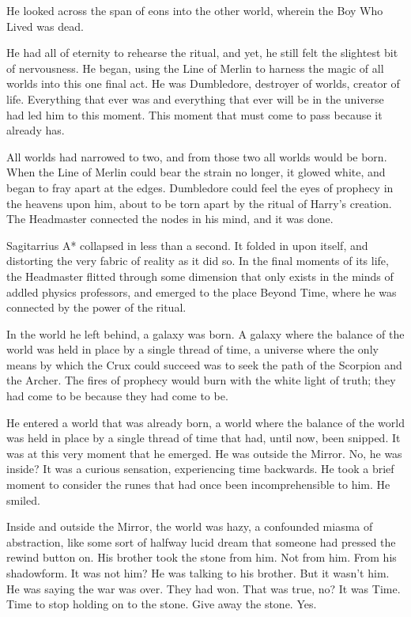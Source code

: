 He looked across the span of eons into the other world, wherein the Boy Who Lived was dead.

He had all of eternity to rehearse the ritual, and yet, he still felt the slightest bit of nervousness. He began, using the Line of Merlin to harness the magic of all worlds into this one final act. He was Dumbledore, destroyer of worlds, creator of life. Everything that ever was and everything that ever will be in the universe had led him to this moment. This moment that must come to pass because it already has.

All worlds had narrowed to two, and from those two all worlds would be born. When the Line of Merlin could bear the strain no longer, it glowed white, and began to fray apart at the edges. Dumbledore could feel the eyes of prophecy in the heavens upon him, about to be torn apart by the ritual of Harry’s creation. The Headmaster connected the nodes in his mind, and it was done.

Sagitarrius A* collapsed in less than a second. It folded in upon itself, and distorting the very fabric of reality as it did so. In the final moments of its life, the Headmaster flitted through some dimension that only exists in the minds of addled physics professors, and emerged to the place Beyond Time, where he was connected by the power of the ritual.

In the world he left behind, a galaxy was born. A galaxy where the balance of the world was held in place by a single thread of time, a universe where the only means by which the Crux could succeed was to seek the path of the Scorpion and the Archer. The fires of prophecy would burn with the white light of truth; they had come to be because they had come to be.

He entered a world that was already born, a world where the balance of the world was held in place by a single thread of time that had, until now, been snipped. It was at this very moment that he emerged. He was outside the Mirror. No, he was inside? It was a curious sensation, experiencing time backwards. He took a brief moment to consider the runes that had once been incomprehensible to him. He smiled.

Inside and outside the Mirror, the world was hazy, a confounded miasma of abstraction, like some sort of halfway lucid dream that someone had pressed the rewind button on. His brother took the stone from him. Not from him. From his shadowform. It was not him?  He was talking to his brother. But it wasn’t him. He was saying the war was over. They had won. That was true, no? It was Time. Time to stop holding on to the stone. Give away the stone. Yes.

